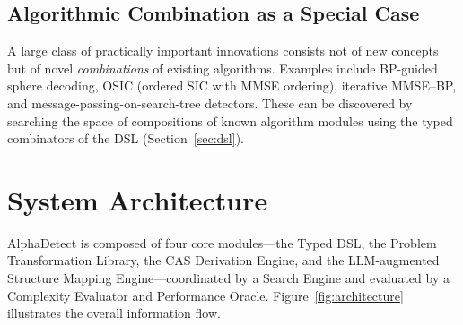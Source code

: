 \documentclass[12pt,a4paper]{article}
\begin{document}
\subsection{Algorithmic Combination as a Special Case}

A large class of practically important innovations consists not of new
concepts but of novel \emph{combinations} of existing algorithms.
Examples include BP-guided sphere decoding, OSIC (ordered SIC with MMSE
ordering), iterative MMSE--BP, and message-passing-on-search-tree detectors.
These can be discovered by searching the space of compositions of known
algorithm modules using the typed combinators of the DSL
(Section~\ref{sec:dsl}).

\section{System Architecture}
\label{sec:architecture}

AlphaDetect is composed of four core modules---the Typed DSL, the Problem
Transformation Library, the CAS Derivation Engine, and the LLM-augmented
Structure Mapping Engine---coordinated by a Search Engine and evaluated by a
Complexity Evaluator and Performance Oracle.
Figure~\ref{fig:architecture} illustrates the overall information flow.
\end{document}
